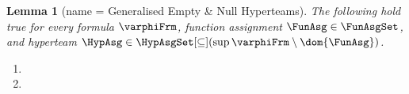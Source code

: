 \documentclass[authoryear]{elsarticle}
\newtheorem{lemma}{Lemma}
\newcommand{\EmpTeamAsg}{\emptyset}
\newcommand{\EmpHypAsg}{\emptyset}
\begin{document}
\begin{lemma}[name = Generalised Empty \& Null Hyperteams]
  \label{lmm:empnulhypMeta}
%
  The following hold true for every \Meta formula $\varphiFrm$, function
  assignment $\FunAsg \in \FunAsgSet$, and hyperteam $\HypAsg \in
  \HypAsgSet[\subseteq](\sup{\varphiFrm} \setminus \dom{\FunAsg})$.
  \begin{enumerate}[1)]
  \item
  \item
  \end{enumerate}
\end{lemma}
\end{document}
